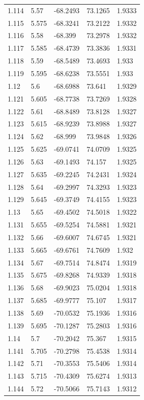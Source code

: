\begin{tabular}{lllll}
1.114 & 5.57 & -68.2493 & 73.1265 & 1.9333 \\
1.115 & 5.575 & -68.3241 & 73.2122 & 1.9332 \\
1.116 & 5.58 & -68.399 & 73.2978 & 1.9332 \\
1.117 & 5.585 & -68.4739 & 73.3836 & 1.9331 \\
1.118 & 5.59 & -68.5489 & 73.4693 & 1.933 \\
1.119 & 5.595 & -68.6238 & 73.5551 & 1.933 \\
1.12 & 5.6 & -68.6988 & 73.641 & 1.9329 \\
1.121 & 5.605 & -68.7738 & 73.7269 & 1.9328 \\
1.122 & 5.61 & -68.8489 & 73.8128 & 1.9327 \\
1.123 & 5.615 & -68.9239 & 73.8988 & 1.9327 \\
1.124 & 5.62 & -68.999 & 73.9848 & 1.9326 \\
1.125 & 5.625 & -69.0741 & 74.0709 & 1.9325 \\
1.126 & 5.63 & -69.1493 & 74.157 & 1.9325 \\
1.127 & 5.635 & -69.2245 & 74.2431 & 1.9324 \\
1.128 & 5.64 & -69.2997 & 74.3293 & 1.9323 \\
1.129 & 5.645 & -69.3749 & 74.4155 & 1.9323 \\
1.13 & 5.65 & -69.4502 & 74.5018 & 1.9322 \\
1.131 & 5.655 & -69.5254 & 74.5881 & 1.9321 \\
1.132 & 5.66 & -69.6007 & 74.6745 & 1.9321 \\
1.133 & 5.665 & -69.6761 & 74.7609 & 1.932 \\
1.134 & 5.67 & -69.7514 & 74.8474 & 1.9319 \\
1.135 & 5.675 & -69.8268 & 74.9339 & 1.9318 \\
1.136 & 5.68 & -69.9023 & 75.0204 & 1.9318 \\
1.137 & 5.685 & -69.9777 & 75.107 & 1.9317 \\
1.138 & 5.69 & -70.0532 & 75.1936 & 1.9316 \\
1.139 & 5.695 & -70.1287 & 75.2803 & 1.9316 \\
1.14 & 5.7 & -70.2042 & 75.367 & 1.9315 \\
1.141 & 5.705 & -70.2798 & 75.4538 & 1.9314 \\
1.142 & 5.71 & -70.3553 & 75.5406 & 1.9314 \\
1.143 & 5.715 & -70.4309 & 75.6274 & 1.9313 \\
1.144 & 5.72 & -70.5066 & 75.7143 & 1.9312 \\

\end{tabular}
